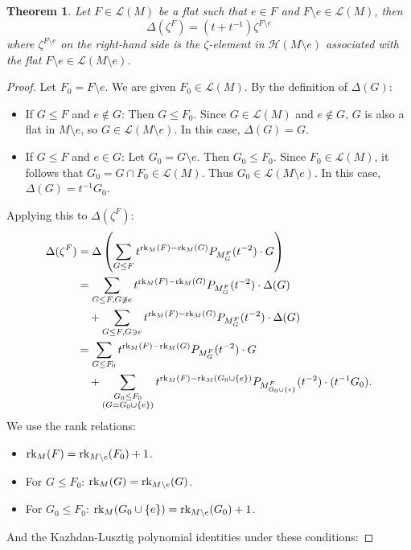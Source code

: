 \documentclass[10pt]{article}
\newcommand{\calL}{\mathcal{L}}
\newcommand{\calH}{\mathcal{H}}
\newcommand{\rank}{\normalfont\text{rk}}
\newtheorem{theorem}{Theorem}
\theoremstyle{remark}
\begin{document}
\begin{theorem}
\label{thm:delta_zeta_special_case}
Let $F \in \calL(M)$ be a flat such that $e \in F$ and $F\setminus e \in \calL(M)$, then
\[ \Delta(\zeta^F) = (t + t^{-1})\zeta^{F\setminus e} \]
where $\zeta^{F\setminus e}$ on the right-hand side is the $\zeta$-element in
$\calH(M\setminus e)$ associated with the flat $F\setminus e \in \calL(M\setminus e)$.
\end{theorem}
\begin{proof}
Let $F_0 = F\setminus e$. We are given $F_0 \in \calL(M)$.
By the definition of $\Delta(G)$:
\begin{itemize}
    \item If $G \leq F$ and $e \notin G$: Then $G \leq F_0$. Since $G \in \calL(M)$ and $e \notin G$, $G$ is also a flat in $M\setminus e$, so $G \in \calL(M\setminus e)$. In this case, $\Delta(G) = G$.
    \item If $G \leq F$ and $e \in G$: Let $G_0 = G\setminus e$. Then $G_0 \leq F_0$. Since $F_0 \in \calL(M)$, it follows that $G_0 = G \cap F_0 \in \calL(M)$. Thus $G_0 \in \calL(M\setminus e)$. In this case, $\Delta(G) = t^{-1}G_0$.
\end{itemize}
Applying this to $\Delta(\zeta^F)$:
\begin{align*}
\Delta(\zeta^F) &= \Delta \left( \sum_{G \leq F} t^{\rank_M(F) - \rank_M(G)} P_{M_G^F}(t^{-2}) \cdot G \right) \\
&= \sum_{G \leq F, G \not\ni e} t^{\rank_M(F) - \rank_M(G)} P_{M_G^F}(t^{-2}) \cdot \Delta(G) \\
&\quad + \sum_{G \leq F, G \ni e} t^{\rank_M(F) - \rank_M(G)} P_{M_G^F}(t^{-2}) \cdot \Delta(G) \\
&= \sum_{G \leq F_0} t^{\rank_M(F) - \rank_M(G)} P_{M_G^F}(t^{-2}) \cdot G \\
&\quad + \sum_{\substack{G_0 \leq F_0 \\ (G = G_0 \cup \{e\})}} t^{\rank_M(F) - \rank_M(G_0 \cup \{e\})} P_{M_{G_0 \cup \{e\}}^{F}}(t^{-2}) \cdot (t^{-1}G_0).
\end{align*}
We use the rank relations:
\begin{itemize}
    \item $\rank_M(F) = \rank_{M\setminus e}(F_0) + 1$.
    \item For $G \leq F_0$: $\rank_M(G) = \rank_{M\setminus e}(G)$.
    \item For $G_0 \leq F_0$: $\rank_M(G_0 \cup \{e\}) = \rank_{M\setminus e}(G_0) + 1$.
\end{itemize}
And the Kazhdan-Lusztig polynomial identities under these conditions:

\end{proof}
\end{document}
